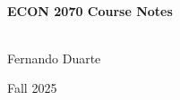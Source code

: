 \begin{titlepage}
\vbox{ }
\vbox{ }

\begin{center}
\vbox{ }
\HRule \\[0.4cm]
{ \huge \bfseries ECON 2070 Course Notes}\\[0.4cm]
\HRule \\[1.5cm]
\begin{minipage}{\textwidth}
\begin{center} \large
Fernando Duarte
\end{center}
\end{minipage}
 \vfill
{\large Fall 2025}
\end{center}
\end{titlepage}